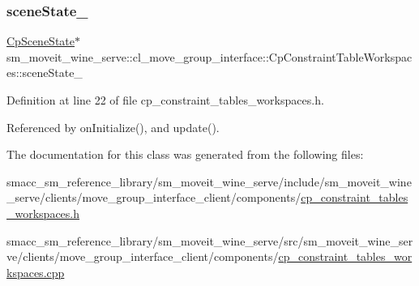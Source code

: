 \subsubsection{\texorpdfstring{scene\+State\+\_\+}{sceneState\_}}
{\footnotesize\ttfamily \hyperlink{classsm__moveit__wine__serve_1_1cl__perception__system_1_1CpSceneState}{Cp\+Scene\+State}$\ast$ sm\+\_\+moveit\+\_\+wine\+\_\+serve\+::cl\+\_\+move\+\_\+group\+\_\+interface\+::\+Cp\+Constraint\+Table\+Workspaces\+::scene\+State\+\_\+\hspace{0.3cm}{\ttfamily [private]}}



Definition at line 22 of file cp\+\_\+constraint\+\_\+tables\+\_\+workspaces.\+h.



Referenced by on\+Initialize(), and update().



The documentation for this class was generated from the following files\+:\begin{DoxyCompactItemize}
\item 
smacc\+\_\+sm\+\_\+reference\+\_\+library/sm\+\_\+moveit\+\_\+wine\+\_\+serve/include/sm\+\_\+moveit\+\_\+wine\+\_\+serve/clients/move\+\_\+group\+\_\+interface\+\_\+client/components/\hyperlink{sm__moveit__wine__serve_2include_2sm__moveit__wine__serve_2clients_2move__group__interface__clie6d2e3587b1a2fb9791e157eb08739678}{cp\+\_\+constraint\+\_\+tables\+\_\+workspaces.\+h}\item 
smacc\+\_\+sm\+\_\+reference\+\_\+library/sm\+\_\+moveit\+\_\+wine\+\_\+serve/src/sm\+\_\+moveit\+\_\+wine\+\_\+serve/clients/move\+\_\+group\+\_\+interface\+\_\+client/components/\hyperlink{sm__moveit__wine__serve_2src_2sm__moveit__wine__serve_2clients_2move__group__interface__client_2da875f836e48ab6be3b616254307d8ee}{cp\+\_\+constraint\+\_\+tables\+\_\+workspaces.\+cpp}\end{DoxyCompactItemize}
